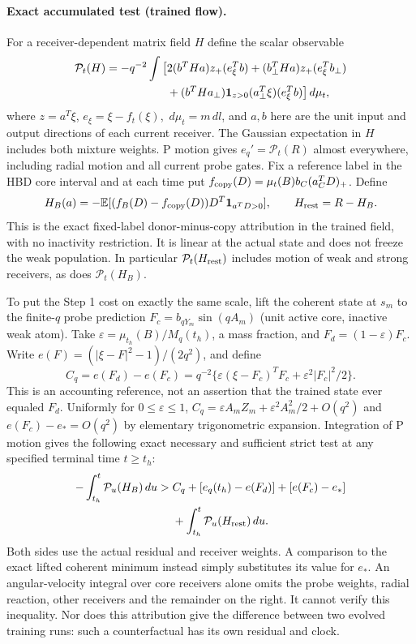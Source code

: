 \documentclass[11pt]{article}
\newcommand{\dd}{\,d}\newcommand{\E}{\mathbb E}
\begin{document}
\paragraph{Exact accumulated test (trained flow).}
For a receiver-dependent matrix field $H$ define the scalar observable
\begin{align*}
 \mathcal P_t(H)=-q^{-2}\int\big[&
 2(b^THa)z_+(e_\xi^Tb)+(b_\perp^THa)z_+(e_\xi^Tb_\perp)\\
 &+(b^THa_\perp){\bf1}_{z>0}(a_\perp^T\xi)(e_\xi^Tb)\big]\dd\mu_t ,
\end{align*}
where $z=a^T\xi$, $e_\xi=\xi-f_t(\xi)$, $\dd\mu_t=m\dd l$,
and $a,b$ here are the unit input and output directions of each
current receiver. The Gaussian expectation in $H$ includes both
mixture weights. P motion gives $e_q'=\mathcal P_t(R)$ almost everywhere,
including radial motion and all current probe gates.
Fix a reference label in the HBD core interval and at each time
put $f_{\rm copy}(D)=\mu_t(B)b_C(a_C^TD)_+$. Define
\[
 H_B(a)=-\E[(f_B(D)-f_{\rm copy}(D))D^T{\bf1}_{a^TD>0}],
 \qquad H_{\rm rest}=R-H_B .
\]
This is the exact fixed-label donor-minus-copy attribution in the
trained field, with no inactivity restriction. It is linear at the
actual state and does not freeze the weak population. In particular
$\mathcal P_t(H_{\rm rest})$ includes motion of weak and strong
receivers, as does $\mathcal P_t(H_B)$.

To put the Step 1 cost on exactly the same scale, lift the coherent
state at $s_m$ to the finite-$q$ probe prediction
$F_c=b_{qY_m}\sin(qA_m)$ (unit active core, inactive weak atom).
Take $\varepsilon=\mu_{t_h}(B)/M_q(t_h)$, a mass fraction, and
$F_d=(1-\varepsilon)F_c$. Write
$e(F)=(|\xi-F|^2-1)/(2q^2)$, and define
\[
 C_q=e(F_d)-e(F_c)
 =q^{-2}\{\varepsilon(\xi-F_c)^TF_c+
                    \varepsilon^2|F_c|^2/2\}.
\]
This is an accounting reference, not an assertion that the trained
state ever equaled $F_d$. Uniformly for $0\le\varepsilon\le1$,
$C_q=\varepsilon A_m Z_m+\varepsilon^2 A_m^2/2+O(q^2)$
and $e(F_c)-e_*=O(q^2)$ by elementary trigonometric expansion.
Integration of P motion gives the following exact necessary and
sufficient strict test at any specified terminal time $t\ge t_h$:
\begin{align}
 -\int_{t_h}^{t}\mathcal P_u(H_B)\dd u
 >{}& C_q+[e_q(t_h)-e(F_d)]+[e(F_c)-e_*]\nonumber\\
    &+\int_{t_h}^t\mathcal P_u(H_{\rm rest})\dd u .
 \label{an04brwv1:payment}
\end{align}
Both sides use the actual residual and receiver weights. A comparison
to the exact lifted coherent minimum instead simply substitutes its
value for $e_*$. An angular-velocity integral over core receivers
alone omits the probe weights, radial reaction, other receivers and
the remainder on the right. It cannot verify this inequality.
Nor does this attribution give the difference between two evolved
training runs: such a counterfactual has its own residual and clock.
\end{document}
